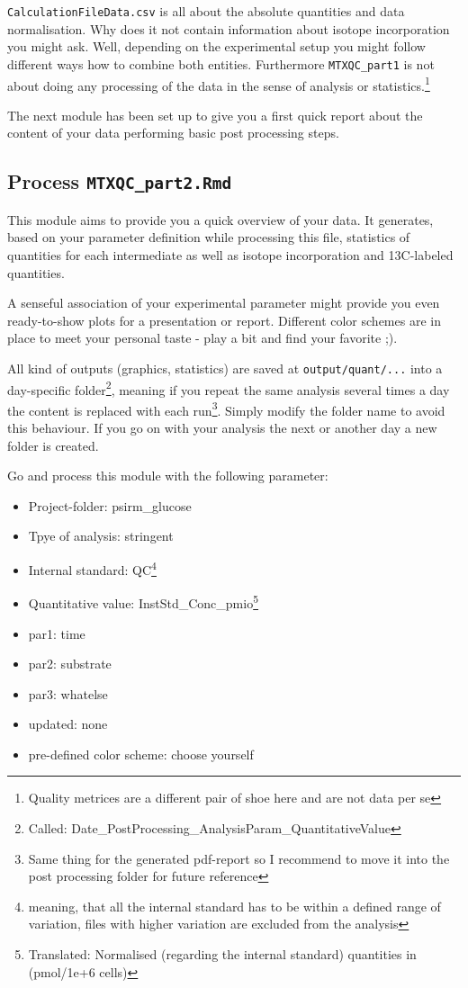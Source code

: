 \documentclass[]{book}
\providecommand{\tightlist}{%
  \setlength{\itemsep}{0pt}\setlength{\parskip}{0pt}}
\let\rmarkdownfootnote\footnote%
\def\footnote{\protect\rmarkdownfootnote}
\theoremstyle{definition}
\theoremstyle{definition}
\theoremstyle{definition}
\theoremstyle{remark}
\begin{document}
\texttt{CalculationFileData.csv} is all about the absolute quantities
and data normalisation. Why does it not contain information about
isotope incorporation you might ask. Well, depending on the experimental
setup you might follow different ways how to combine both entities.
Furthermore \texttt{MTXQC\_part1} is not about doing any processing of
the data in the sense of analysis or statistics.\footnote{Quality
  metrices are a different pair of shoe here and are not data per se}

The next module has been set up to give you a first quick report about
the content of your data performing basic post processing steps.

\subsection{\texorpdfstring{Process
\texttt{MTXQC\_part2.Rmd}}{Process MTXQC\_part2.Rmd}}\label{process-mtxqc_part2.rmd}

This module aims to provide you a quick overview of your data. It
generates, based on your parameter definition while processing this
file, statistics of quantities for each intermediate as well as isotope
incorporation and 13C-labeled quantities.

A senseful association of your experimental parameter might provide you
even ready-to-show plots for a presentation or report. Different color
schemes are in place to meet your personal taste - play a bit and find
your favorite ;).

All kind of outputs (graphics, statistics) are saved at
\texttt{output/quant/...} into a day-specific folder\footnote{Called:
  Date\_PostProcessing\_AnalysisParam\_QuantitativeValue}, meaning if
you repeat the same analysis several times a day the content is replaced
with each run\footnote{Same thing for the generated pdf-report so I
  recommend to move it into the post processing folder for future
  reference}. Simply modify the folder name to avoid this behaviour. If
you go on with your analysis the next or another day a new folder is
created.

Go and process this module with the following parameter:

\begin{itemize}
\tightlist
\item
  Project-folder: psirm\_glucose
\item
  Tpye of analysis: stringent
\item
  Internal standard: QC\footnote{meaning, that all the internal standard
    has to be within a defined range of variation, files with higher
    variation are excluded from the analysis}
\item
  Quantitative value: InstStd\_Conc\_pmio\footnote{Translated:
    Normalised (regarding the internal standard) quantities in
    (pmol/1e+6 cells)}
\item
  par1: time
\item
  par2: substrate
\item
  par3: whatelse
\item
  updated: none
\item
  pre-defined color scheme: choose yourself
\end{itemize}
\end{document}

